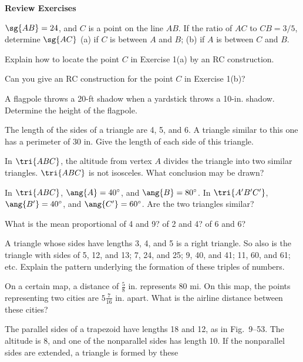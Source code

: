 \documentclass[11pt]{book}
\theoremstyle{bkplain}
\theoremstyle{XIplainnote}
\theoremstyle{bkplain}
\theoremstyle{bkplain}
\begin{document}
\begin{center}\bfseries Review Exercises\end{center}

\begin{exlist}
\item $\sg{AB} = 24$, and $C$ is a point on the line $AB$. If the ratio of $AC$
      to $CB = 3/5$, determine $\sg{AC}$ (a) if $C$ is between $A$ and $B$;
      (b) if $A$ is between $C$ and $B$.
\item Explain how to locate the point $C$ in Exercise 1(a) by an RC
      construction.
\item[\stex 3.] Can you give an RC construction for the point $C$ in Exercise
      1(b)?
\item[4.] A flagpole throws a 20-ft shadow when a yardstick throws a 10-in.
      shadow. Determine the height of the flagpole.
\item[5.] The length of the sides of a triangle are 4, 5, and 6. A triangle
      similar to this one has a perimeter of 30 in. Give the length of each side
      of this triangle.
\item[6.] In $\tri{ABC}$, the altitude from vertex $A$ divides the triangle into
      two similar triangles. $\tri{ABC}$ is not isosceles. What conclusion may
      be drawn?
\item[7.] In $\tri{ABC}$, $\ang{A} = 40^\circ$, and $\ang{B} = 80^\circ$. In
      $\tri{A'B'C'}$, $\ang{B'} = 40^\circ$, and $\ang{C'} = 60^\circ$. Are the
      two triangles similar?
\item[8.] What is the mean proportional of 4 and 9? of 2 and 4? of 6 and 6?
\item[9.] A triangle whose sides have lengths 3, 4, and 5 is a right triangle.
      So also is the triangle with sides of 5, 12, and 13; 7, 24, and 25; 9, 40,
      and 41; 11, 60, and 61; etc. Explain the pattern underlying the formation
      of these triples of numbers.
\item[10.] On a certain map, a distance of $\frac{5}{8}$ in. represents 80 mi.
      On this map, the points representing two cities are $5\frac{7}{16}$ in.
      apart. What is the airline distance between these cities?
\item[11.] The parallel sides of a trapezoid have lengths 18 and 12, as in
      Fig.~9--53. The altitude is 8, and one of the nonparallel sides has length
      10. If the nonparallel sides are extended, a triangle is formed by these

\end{exlist}
\end{document}

